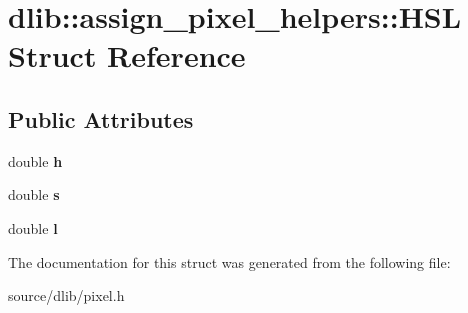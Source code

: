 \hypertarget{structdlib_1_1assign__pixel__helpers_1_1HSL}{
\section{dlib::assign\_\-pixel\_\-helpers::HSL Struct Reference}
\label{structdlib_1_1assign__pixel__helpers_1_1HSL}
}
\subsection*{Public Attributes}
\begin{DoxyCompactItemize}
\item 
\hypertarget{structdlib_1_1assign__pixel__helpers_1_1HSL_a708cf7ee55919d08a3cbe0019685ba55}{
double {\bfseries h}}
\label{structdlib_1_1assign__pixel__helpers_1_1HSL_a708cf7ee55919d08a3cbe0019685ba55}

\item 
\hypertarget{structdlib_1_1assign__pixel__helpers_1_1HSL_a51055d41b09bc3d89f63eb00ba4789e7}{
double {\bfseries s}}
\label{structdlib_1_1assign__pixel__helpers_1_1HSL_a51055d41b09bc3d89f63eb00ba4789e7}

\item 
\hypertarget{structdlib_1_1assign__pixel__helpers_1_1HSL_a4f9c90fb7bac1cb003edd7e8da974c1f}{
double {\bfseries l}}
\label{structdlib_1_1assign__pixel__helpers_1_1HSL_a4f9c90fb7bac1cb003edd7e8da974c1f}

\end{DoxyCompactItemize}


The documentation for this struct was generated from the following file:\begin{DoxyCompactItemize}
\item 
source/dlib/pixel.h\end{DoxyCompactItemize}
